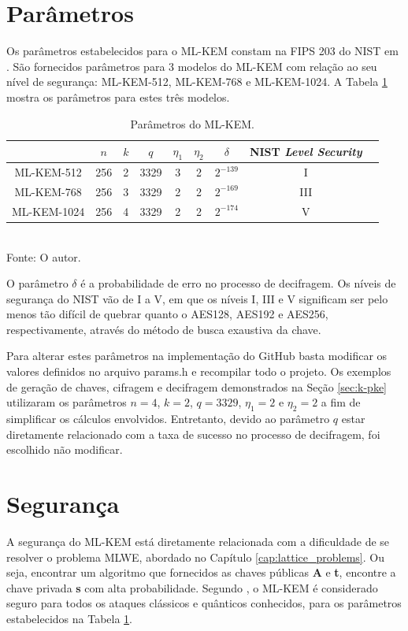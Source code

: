 \section{Parâmetros}
\label{sec:parametros}
    Os parâmetros estabelecidos para o \ac{ML-KEM} constam na FIPS 203 do \ac{NIST} em \cite{kyber}. São fornecidos parâmetros para 3 modelos do \ac{ML-KEM} com relação ao seu nível de segurança: ML-KEM-512, ML-KEM-768 e ML-KEM-1024. A Tabela \ref{tab:kyber_param} mostra os parâmetros para estes três modelos.\\ 
    
    \begin{table}[h!]
        \centering
        \caption{Parâmetros do \ac{ML-KEM}.}
        \begin{tabular}{|c|c|c|c|c|c|c|c|c|}
        \hline
                  & $n$ & $k$ & $q$ & $\eta_1$ & $\eta_2$ & $\delta$ & \ac{NIST} \textit{Level Security} \\ \hline
        ML-KEM-512  & 256 & 2 & 3329 & 3 & 2 & $2^{-139}$ & I   \\ \hline
        ML-KEM-768  & 256 & 3 & 3329 & 2 & 2 & $2^{-169}$ & III \\ \hline
        ML-KEM-1024 & 256 & 4 & 3329 & 2 & 2 & $2^{-174}$ & V   \\ \hline
        \end{tabular}\\
        \footnotesize{Fonte: O autor.}
        \label{tab:kyber_param}
    \end{table}

    O parâmetro $\delta$ é a probabilidade de erro no processo de decifragem. Os níveis de segurança do \ac{NIST} vão de I a V, em que os níveis I, III e V significam ser pelo menos tão difícil de quebrar quanto o AES128, AES192 e AES256, respectivamente, através do método de busca exaustiva da chave.

    Para alterar estes parâmetros na implementação do GitHub basta modificar os valores definidos no arquivo params.h e recompilar todo o projeto. Os exemplos de geração de chaves, cifragem e decifragem demonstrados na Seção \ref{sec:k-pke} utilizaram os parâmetros $n = 4$, $k = 2$, $q = 3329$, $\eta_1 = 2$ e $\eta_2 = 2$ a fim de simplificar os cálculos envolvidos. Entretanto, devido ao parâmetro $q$ estar diretamente relacionado com a taxa de sucesso no processo de decifragem, foi escolhido não modificar. 
    
\section{Segurança}
    A segurança do \ac{ML-KEM} está diretamente relacionada com a dificuldade de se resolver o problema \ac{MLWE}, abordado no Capítulo \ref{cap:lattice_problems}. Ou seja, encontrar um algoritmo que fornecidos as chaves públicas \textbf{A} e \textbf{t}, encontre a chave privada \textbf{s} com alta probabilidade. Segundo \cite{kyber2}, o \ac{ML-KEM} é considerado seguro para todos os ataques clássicos e quânticos conhecidos, para os parâmetros estabelecidos na Tabela \ref{tab:kyber_param}.

